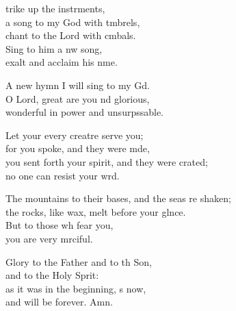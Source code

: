 \settowidth{\versewidth}{The mountains to their bases, and the seas are shaken; *}
\begin{psalmverse}%
  \begin{patverse}
    trike up the instrments,\Flex\\
a song to my God with t\pointup{\i}mbrels,\Med\\
chant to the Lord with cmbals.\\
Sing to him a nw song,\Med\\
exalt and acclaim his nme.

A new hymn I will sing to my Gd.\Flex\\
O Lord, great are you nd glorious,\Med\\
wonderful in power and unsurpssable.

Let your every creatre serve you;\Med\\
for you spoke, and they were mde,\\
you sent forth your spirit, and they were crated;\Med\\
no one can resist your wrd.

The mountains to their bases, and the seas re shaken;\Med\\
the rocks, like wax, melt before your glnce.\\
But to those wh fear you,\Med\\
you are very mrciful.

Glory to the Father and to th Son,\Med\\
and to the Holy Sp\pointup{\i}rit:\\
as it was in the beginning, \pointup{\i}s now,\Med\\
and will be forever. Amn. 
  \end{patverse}
\end{psalmverse}
